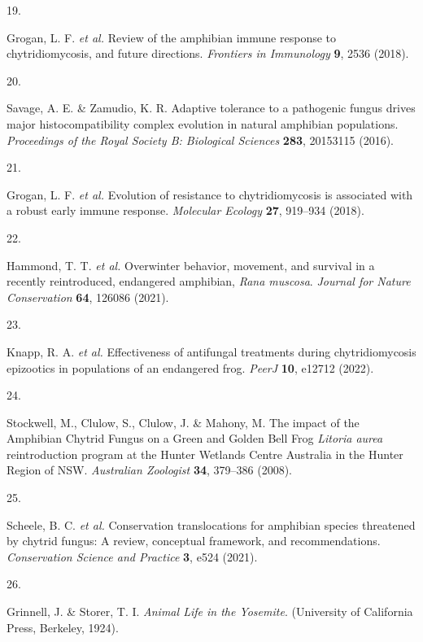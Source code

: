 \documentclass[
  letterpaper,
  DIV=11,
  numbers=noendperiod]{scrartcl}
\newlength{\cslhangindent}
\newlength{\csllabelwidth}
\newenvironment{CSLReferences}[2] %
 {\begin{list}{}{%
  \setlength{\itemindent}{0pt}
  \setlength{\leftmargin}{0pt}
  \setlength{\parsep}{0pt}
  \ifodd #1
   \setlength{\leftmargin}{\cslhangindent}
   \setlength{\itemindent}{-1\cslhangindent}
  \fi
  \setlength{\itemsep}{#2\baselineskip}}}
 {\end{list}}
\newcommand{\CSLLeftMargin}[1]{\parbox[t]{\csllabelwidth}{\strut#1\strut}}
\newcommand{\CSLRightInline}[1]{\parbox[t]{\linewidth - \csllabelwidth}{\strut#1\strut}}
\begin{document}
\begin{CSLReferences}{0}{0}
\CSLLeftMargin{19. }%
\CSLRightInline{Grogan, L. F. \emph{et al.} Review of the amphibian
immune response to chytridiomycosis, and future directions.
\emph{Frontiers in Immunology} \textbf{9}, 2536 (2018).}

\CSLLeftMargin{20. }%
\CSLRightInline{Savage, A. E. \& Zamudio, K. R. Adaptive tolerance to a
pathogenic fungus drives major histocompatibility complex evolution in
natural amphibian populations. \emph{Proceedings of the Royal Society B:
Biological Sciences} \textbf{283}, 20153115 (2016).}

\CSLLeftMargin{21. }%
\CSLRightInline{Grogan, L. F. \emph{et al.} Evolution of resistance to
chytridiomycosis is associated with a robust early immune response.
\emph{Molecular Ecology} \textbf{27}, 919--934 (2018).}

\CSLLeftMargin{22. }%
\CSLRightInline{Hammond, T. T. \emph{et al.} Overwinter behavior,
movement, and survival in a recently reintroduced, endangered amphibian,
\emph{{R}ana muscosa}. \emph{Journal for Nature Conservation}
\textbf{64}, 126086 (2021).}

\CSLLeftMargin{23. }%
\CSLRightInline{Knapp, R. A. \emph{et al.} Effectiveness of antifungal
treatments during chytridiomycosis epizootics in populations of an
endangered frog. \emph{PeerJ} \textbf{10}, e12712 (2022).}

\CSLLeftMargin{24. }%
\CSLRightInline{Stockwell, M., Clulow, S., Clulow, J. \& Mahony, M. The
impact of the {Amphibian Chytrid Fungus} on a {Green and Golden Bell
Frog} {\emph{{L}itoria aurea}} reintroduction program at the {Hunter
Wetlands Centre Australia in the Hunter Region of NSW}. \emph{Australian
Zoologist} \textbf{34}, 379--386 (2008).}

\CSLLeftMargin{25. }%
\CSLRightInline{Scheele, B. C. \emph{et al.} Conservation translocations
for amphibian species threatened by chytrid fungus: A review, conceptual
framework, and recommendations. \emph{Conservation Science and Practice}
\textbf{3}, e524 (2021).}

\CSLLeftMargin{26. }%
\CSLRightInline{Grinnell, J. \& Storer, T. I. \emph{{A}nimal {L}ife in
the {Y}osemite}. (University of California Press, Berkeley, 1924).}


\end{CSLReferences}
\end{document}
